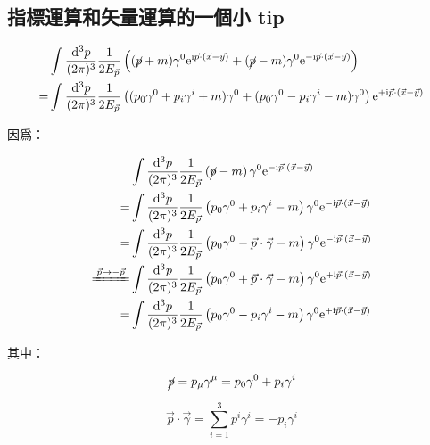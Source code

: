 \documentclass{article}
\begin{document}
\subsection{指標運算和矢量運算的一個小 tip}

$$
  \begin{aligned}
      & \int\frac{\mathrm{d}^3p}{(2\pi)^3}\frac{1}{2E_{\vec{p}}}\left((\cancel{p}+m)\gamma^0\mathrm{e}^{\mathrm{i}\vec{p}\cdot(\vec{x}-\vec{y})}+(\cancel{p}-m)\gamma^0\mathrm{e}^{-\mathrm{i}\vec{p}\cdot(\vec{x}-\vec{y})}\right) \\
    = & \int\frac{\mathrm{d}^3p}{(2\pi)^3}\frac{1}{2E_{\vec{p}}}\left((p_0\gamma^0+p_i\gamma^i+m)\gamma^0+(p_0\gamma^0-p_i\gamma^i-m)\gamma^0\right)\mathrm{e}^{+\mathrm{i}\vec{p}\cdot(\vec{x}-\vec{y})}
  \end{aligned}
$$

因爲：

$$
  \begin{aligned}
                                    & \int\frac{\mathrm{d}^3p}{(2\pi)^3}\frac{1}{2E_{\vec{p}}}\left(\cancel{p}-m\right)\gamma^0\mathrm{e}^{-\mathrm{i}\vec{p}\cdot(\vec{x}-\vec{y})}                           \\
    =                               & \int\frac{\mathrm{d}^3p}{(2\pi)^3}\frac{1}{2E_{\vec{p}}}\left(p_0\gamma^0+p_i\gamma^i-m\right)\gamma^0\mathrm{e}^{-\mathrm{i}\vec{p}\cdot(\vec{x}-\vec{y})}              \\
    =                               & \int\frac{\mathrm{d}^3p}{(2\pi)^3}\frac{1}{2E_{\vec{p}}}\left(p_0\gamma^0-\vec{p}\cdot\vec{\gamma}-m\right)\gamma^0\mathrm{e}^{-\mathrm{i}\vec{p}\cdot(\vec{x}-\vec{y})} \\
    \xlongequal{\vec{p}\to-\vec{p}} & \int\frac{\mathrm{d}^3p}{(2\pi)^3}\frac{1}{2E_{\vec{p}}}\left(p_0\gamma^0+\vec{p}\cdot\vec{\gamma}-m\right)\gamma^0\mathrm{e}^{+\mathrm{i}\vec{p}\cdot(\vec{x}-\vec{y})} \\
    =                               & \int\frac{\mathrm{d}^3p}{(2\pi)^3}\frac{1}{2E_{\vec{p}}}\left(p_0\gamma^0-p_i\gamma^i-m\right)\gamma^0\mathrm{e}^{+\mathrm{i}\vec{p}\cdot(\vec{x}-\vec{y})}              \\
  \end{aligned}
$$

其中：

$$
  \cancel{p}=p_{\mu}\gamma^{\mu}=p_0\gamma^0+p_i\gamma^i
$$

$$
  \vec{p}\cdot\vec{\gamma}=\sum_{i=1}^3p^i\gamma^i=-p_i\gamma^i
$$
\end{document}
